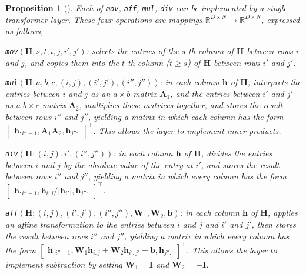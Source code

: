 \documentclass[11pt]{article}
\theoremstyle{plain}
\newtheorem{proposition}[theorem]{Proposition}
\theoremstyle{definition}
\theoremstyle{remark}
\renewcommand{\^}[1]{^{(#1)}}
\newcommand{\bA}{\boldsymbol{A}}
\newcommand{\bh}{\boldsymbol{h}}
\newcommand{\bH}{\boldsymbol{H}}
\newcommand{\bI}{\boldsymbol{I}}
\newcommand{\bW}{\boldsymbol{W}}
\begin{document}
\begin{proposition}[\citealp{Akyrek2022WhatLA}]\label{prop:akyrek}
    Each of \verb|mov|, \verb|aff|, \verb|mul|, \verb|div|  can be implemented by a single transformer layer. These four operations are mappings $\mathbb R^{D \times N} \rightarrow \mathbb R^{D \times N}$, expressed as follows, 

\verb|mov|$(\bH; s, t, i, j, i', j')$: selects the entries of the $s$-th column of $\bH$ between rows $i$ and $j$, and copies
them into the $t$-th column ($t \geq s$) of $\bH$ between rows $i'$ and $j'$. 

\verb|mul|$(\bH; a, b, c, (i, j), (i', j'), (i'', j''))$: in each column $\bh$ of $\bH$, interprets the entries between $i$ and $j$ as an $a \times b$ matrix $\bA_1$, and the entries between $i'$ and $j'$ as a $b \times c$ matrix $\bA_2$, multiplies these matrices together, and stores the result between rows $i''$ and $j''$, yielding a matrix in which each column has the form 
$\begin{bmatrix}
    \bh_{:i''-1}, \bA_1 \bA_2, \bh_{j'':}
\end{bmatrix}^\top$. This allows the layer to implement inner products. 

\verb|div|$(\bH; (i, j), i', (i'', j''))$: in each column $\bh$ of $\bH$, divides the entries between $i$ and $j$ by the absolute value of the entry at $i'$, and stores the result between rows $i''$ and $j''$, yielding a matrix in which every column has the form $\begin{bmatrix}
    \bh_{:i''-1}, \bh_{i:j} / |\bh_{i'}|, \bh_{j'':}
\end{bmatrix}^\top$.

\verb|aff|$(\bH; (i, j), (i', j'), (i'', j''), \bW_1, \bW_2, \mathbf{b})$: in each column $\bh$ of $\bH$, applies an affine transformation to the entries between $i$ and $j$ and $i'$ and $j'$, then stores the result between rows $i''$ and $j''$, yielding a matrix in which every column has the form $\begin{bmatrix}
    \bh_{:i''-1}, \bW_1 \bh_{i:j} + \bW_2 \bh_{i':j'} + \mathbf{b}, \bh_{j'':}
\end{bmatrix}^\top$. This allows the layer to implement subtraction by setting $\bW_1 = \bI$ and $\bW_2 = -\bI$.

\end{proposition}
\end{document}
